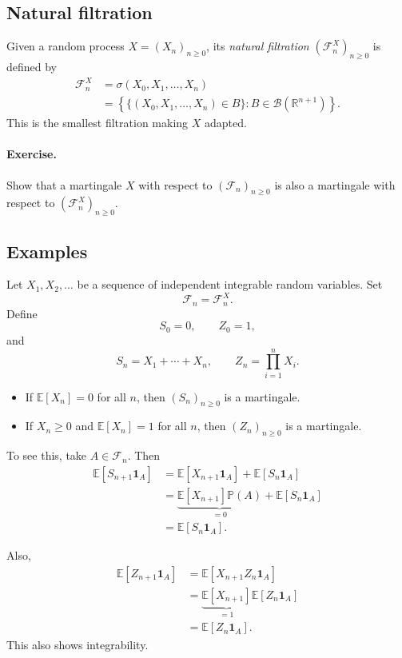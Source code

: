 \documentclass[11pt,a4paper]{article}
\begin{document}
\subsection{Natural filtration}

Given a random process $X=(X_n)_{n\geq0}$, its
\emph{natural filtration} $(\mathcal{F}_n^X)_{n\geq0}$
is defined by
\[
\begin{aligned}
\mathcal{F}_n^X
&=
\sigma(X_0,X_1,\ldots,X_n)\\
&=
\left\{
\{(X_0,X_1,\ldots,X_n)\in B\}:
B\in\mathcal{B}(\mathbb{R}^{n+1})
\right\}.
\end{aligned}
\]
This is the smallest filtration making $X$ adapted.

\paragraph{Exercise.}
Show that a martingale $X$ with respect to
$(\mathcal{F}_n)_{n\geq0}$ is also a martingale with respect
to $(\mathcal{F}_n^X)_{n\geq0}$.

\subsection{Examples}

Let $X_1,X_2,\ldots$ be a sequence of independent integrable
random variables. Set
\[
\mathcal{F}_n=\mathcal{F}_n^X.
\]
Define
\[
S_0=0,
\qquad
Z_0=1,
\]
and
\[
S_n=X_1+\cdots+X_n,
\qquad
Z_n=\prod_{i=1}^{n}X_i.
\]

\begin{itemize}
    \item If $\mathbb{E}[X_n]=0$ for all $n$, then
    $(S_n)_{n\geq0}$ is a martingale.

    \item If $X_n\geq0$ and $\mathbb{E}[X_n]=1$ for all $n$,
    then $(Z_n)_{n\geq0}$ is a martingale.
\end{itemize}

To see this, take $A\in\mathcal{F}_n$. Then
\[
\begin{aligned}
\mathbb{E}[S_{n+1}\mathbf{1}_A]
&=
\mathbb{E}[X_{n+1}\mathbf{1}_A]
+
\mathbb{E}[S_n\mathbf{1}_A]\\
&=
\underbrace{
\mathbb{E}[X_{n+1}]\mathbb{P}(A)
}_{=0}
+
\mathbb{E}[S_n\mathbf{1}_A]\\
&=
\mathbb{E}[S_n\mathbf{1}_A].
\end{aligned}
\]

Also,
\[
\begin{aligned}
\mathbb{E}[Z_{n+1}\mathbf{1}_A]
&=
\mathbb{E}[X_{n+1}Z_n\mathbf{1}_A]\\
&=
\underbrace{
\mathbb{E}[X_{n+1}]
}_{=1}
\mathbb{E}[Z_n\mathbf{1}_A]\\
&=
\mathbb{E}[Z_n\mathbf{1}_A].
\end{aligned}
\]
This also shows integrability.
\end{document}
